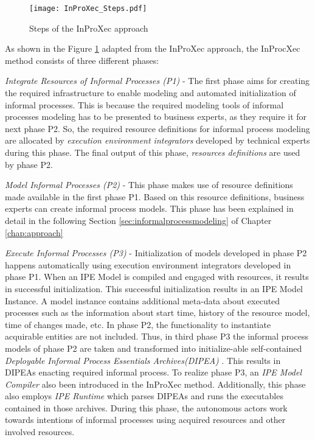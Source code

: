 \begin{figure}
	\centering
	\texttt{[image: InProXec\_Steps.pdf]}
	\caption{Steps of the InProXec approach}
	\label{fig:inprocxec_steps}
\end{figure} 

As shown in the Figure \ref{fig:inprocxec_steps} adapted from the InProXec approach, the InProcXec method consists of three different phases:

\textit{Integrate Resources of Informal Processes (P1)} - The first phase aims for creating the required infrastructure to enable modeling and automated initialization of informal processes. This is because the required modeling tools of informal processes modeling has to be presented to  business experts, as they require it for next phase P2. So, the required resource definitions for informal process modeling are allocated by \textit{execution environment integrators} developed by technical experts during this phase. The final output of this phase, \textit{resources definitions} are used by phase P2. 

\textit{Model Informal Processes (P2)} - This phase makes use of resource definitions made available in the first phase P1.  Based on this resource definitions, business experts can create informal process models. This phase has been explained in detail in the following Section \ref{sec:informalprocessmodeling} of Chapter \ref{chap:approach}

\textit{Execute Informal Processes (P3)} - Initialization of models developed in phase P2 happens automatically using execution environment integrators developed in phase P1. When an IPE Model is compiled and engaged with resources, it results in successful initialization. This successful initialization results in an IPE Model Instance. A model instance contains additional meta-data about executed processes such as the information about start time, history of the resource model, time of changes made, etc. In phase P2, the functionality to instantiate acquirable entities are not included. Thus, in third phase P3 the informal process models of phase P2 are taken and transformed into initialize-able self-contained \textit{Deployable Informal Process Essentials Archives(DIPEA)} \cite{Sungur2015}. This results in DIPEAs enacting required informal process. To realize phase P3, an \textit{IPE Model Compiler} also been introduced in the InProXec method. Additionally, this phase also employs \textit{IPE Runtime} which parses DIPEAs and runs the executables contained in those archives. During this phase, the autonomous actors work towards intentions of informal processes using acquired resources and other involved resources.  











